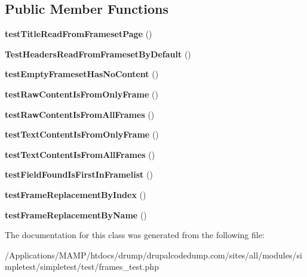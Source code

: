 \subsection*{Public Member Functions}
\begin{DoxyCompactItemize}
\item 
\hypertarget{class_test_of_frameset_ada56f469aec7c85aba90bf1c3c1f91a7}{
{\bfseries testTitleReadFromFramesetPage} ()}
\label{class_test_of_frameset_ada56f469aec7c85aba90bf1c3c1f91a7}

\item 
\hypertarget{class_test_of_frameset_a28eb9083831d51f9bb4a869444d7ced5}{
{\bfseries TestHeadersReadFromFramesetByDefault} ()}
\label{class_test_of_frameset_a28eb9083831d51f9bb4a869444d7ced5}

\item 
\hypertarget{class_test_of_frameset_ae552089668e30d421db70dd3cdd9c1bf}{
{\bfseries testEmptyFramesetHasNoContent} ()}
\label{class_test_of_frameset_ae552089668e30d421db70dd3cdd9c1bf}

\item 
\hypertarget{class_test_of_frameset_a82be41ce71f1485c482f4fbb8169475f}{
{\bfseries testRawContentIsFromOnlyFrame} ()}
\label{class_test_of_frameset_a82be41ce71f1485c482f4fbb8169475f}

\item 
\hypertarget{class_test_of_frameset_a6c457c4d739e34f2c8c74eeab46f565b}{
{\bfseries testRawContentIsFromAllFrames} ()}
\label{class_test_of_frameset_a6c457c4d739e34f2c8c74eeab46f565b}

\item 
\hypertarget{class_test_of_frameset_a358fb599595b183fec1faa3682a4d19e}{
{\bfseries testTextContentIsFromOnlyFrame} ()}
\label{class_test_of_frameset_a358fb599595b183fec1faa3682a4d19e}

\item 
\hypertarget{class_test_of_frameset_a2765bd374fa4ab422cc5f2d0438ea98f}{
{\bfseries testTextContentIsFromAllFrames} ()}
\label{class_test_of_frameset_a2765bd374fa4ab422cc5f2d0438ea98f}

\item 
\hypertarget{class_test_of_frameset_aa5a6cc36ba8ae0ad9c417fbdc4f922c8}{
{\bfseries testFieldFoundIsFirstInFramelist} ()}
\label{class_test_of_frameset_aa5a6cc36ba8ae0ad9c417fbdc4f922c8}

\item 
\hypertarget{class_test_of_frameset_aa1c29f6d665fbe956a1d9c4387ab65be}{
{\bfseries testFrameReplacementByIndex} ()}
\label{class_test_of_frameset_aa1c29f6d665fbe956a1d9c4387ab65be}

\item 
\hypertarget{class_test_of_frameset_ae0ced04fa06429b9392016946ffd7c94}{
{\bfseries testFrameReplacementByName} ()}
\label{class_test_of_frameset_ae0ced04fa06429b9392016946ffd7c94}

\end{DoxyCompactItemize}


The documentation for this class was generated from the following file:\begin{DoxyCompactItemize}
\item 
/Applications/MAMP/htdocs/drump/drupalcodedump.com/sites/all/modules/simpletest/simpletest/test/frames\_\-test.php\end{DoxyCompactItemize}
